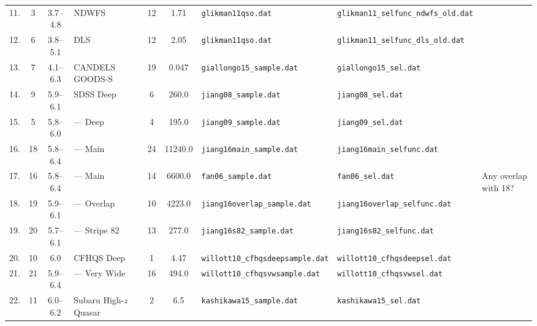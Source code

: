 \documentclass[a4paper,fleqn,usenatbib]{mnras}
\begin{document}
\begin{landscape}
\begin{table}
\begin{tabular}{cccllcclll}
      11. & 3 & 3.7--4.8 & NDWFS & \citet{2011ApJ...728L..26G} & 12 & 1.71 & \texttt{glikman11qso.dat} & \texttt{glikman11\_selfunc\_ndwfs\_old.dat} & \\
      12. & 6 & 3.8--5.1 & DLS & \citet{2011ApJ...728L..26G} & 12 & 2.05 & \texttt{glikman11qso.dat} & \texttt{glikman11\_selfunc\_dls\_old.dat} & \\
      13. & 7 & 4.1--6.3 & CANDELS GOODS-S & \citet{2015AA...578A..83G} & 19 & 0.047 & \texttt{giallongo15\_sample.dat} & \texttt{giallongo15\_sel.dat} &  \\
      14. & 9 & 5.9--6.1 & SDSS Deep & \citet{2008AJ....135.1057J} & 6 & 260.0 & \texttt{jiang08\_sample.dat} & \texttt{jiang08\_sel.dat} \\
      15. & 5 & 5.8--6.0 & --- Deep & \citet{2009AJ....138..305J} & 4 & 195.0 & \texttt{jiang09\_sample.dat} & \texttt{jiang09\_sel.dat} \\
      16. & 18 & 5.8--6.4 & --- Main & \citet{2016ApJ...833..222J} & 24 & 11240.0 & \texttt{jiang16main\_sample.dat} & \texttt{jiang16main\_selfunc.dat} \\
      17. & 16 & 5.8--6.4 & --- Main & \citet{2006AJ....131.1203F} & 14 & 6600.0 & \texttt{fan06\_sample.dat} & \texttt{fan06\_sel.dat} & Any overlap with 18? \\
      18. & 19 & 5.9--6.1 & --- Overlap & \citet{2016ApJ...833..222J} & 10 & 4223.0 & \texttt{jiang16overlap\_sample.dat} & \texttt{jiang16overlap\_selfunc.dat} \\
      19. & 20 & 5.7--6.1 & --- Stripe 82 & \citet{2016ApJ...833..222J} & 13 & 277.0 & \texttt{jiang16s82\_sample.dat} & \texttt{jiang16s82\_selfunc.dat} \\
      20. & 10 & 6.0 & CFHQS Deep & \citet{2010AJ....139..906W} & 1 & 4.47 & \texttt{willott10\_cfhqsdeepsample.dat} & \texttt{willott10\_cfhqsdeepsel.dat} \\
      21. & 21 & 5.9--6.4 & --- Very Wide & \citet{2010AJ....139..906W} & 16 & 494.0 & \texttt{willott10\_cfhqsvwsample.dat} & \texttt{willott10\_cfhqsvwsel.dat} \\
      22. & 11 & 6.0--6.2 & Subaru High-$z$ Quasar & \citet{2015ApJ...798...28K} & 2 & 6.5 & \texttt{kashikawa15\_sample.dat} & \texttt{kashikawa15\_sel.dat} \\ 
      
    \end{tabular}
  \end{table}
\end{landscape}
\end{document}
